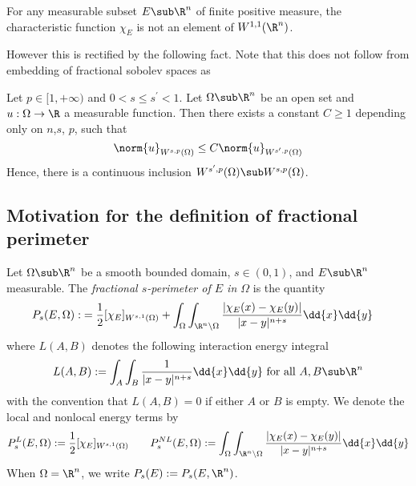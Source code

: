 \documentclass[../main.tex]{subfiles}
\begin{document}
\begin{fact}
    For any measurable subset $ E\sub \R^{n} $ of finite positive measure, the characteristic function $ \chi_{E} $ is not an element of $ W^{1,1}(\R^{n})$.
\end{fact}




However this is rectified by the following fact. Note that this does not follow from embedding of fractional sobolev spaces as $  $



\begin{proposition}
    Let $ p\in[1,+\infty) $ and $ 0 < s \leq s^{\prime} < 1 $. Let $ \Omega\sub \R^{n} $ be an open set and $ u:\Omega\to \R $ a measurable function. Then there exists a constant $ C \geq 1 $ depending only on $ n$,$s$, $p$, such that
    \[
        \norm{u}_{W^{s,p}(\Omega)} \leq C\norm{u}_{W^{s^{\prime},p}(\Omega)}
    \]
    Hence, there is a continuous inclusion $ W^{s^{\prime},p}(\Omega)\sub W^{s,p}(\Omega)$.
\end{proposition}



\subsection{Motivation for the definition of fractional perimeter}


\begin{definition}\label{fracperim}
    Let $ \Omega\sub \R^{n} $ be a smooth bounded domain, $ s\in (0,1) $, and $ E\sub \R^{n} $ measurable. The \textit{fractional $ s $-perimeter of $ E $ in $ \Omega $} is the quantity
    \begin{align*}
        P_{s}(E, \Omega) :&= \frac{1}{2}[\chi_{E}]_{W^{s,1}(\Omega)} + \int_{\Omega}\int_{\R^{n}\setminus \Omega} \frac{| \chi_{E}(x) - \chi_{E}(y)|}{|x-y|^{n+s}}\dd{x}\dd{y} 
    \end{align*}
    where $ L(A,B) $ denotes the following interaction energy integral
    \[
        L(A,B) := \int_{A}\int_{B}\frac{1}{|x-y|^{n+s}}\dd{x}\dd{y} \text{ for all } A,B\sub \R^{n}
    \]
    with the convention that $ L(A,B) = 0 $ if either $ A $ or $ B $ is empty. We denote the local and nonlocal energy terms by
    \[
        P_{s}^{L}(E,\Omega) := \frac{1}{2}[\chi_{E}]_{W^{s,1}(\Omega)} \quad \quad P_{s}^{NL}(E,\Omega) := \int_{\Omega}\int_{\R^{n}\setminus \Omega} \frac{| \chi_{E}(x) - \chi_{E}(y)|}{|x-y|^{n+s}}\dd{x}\dd{y} 
    \]
    When $ \Omega =\R^{n} $, we write $ P_{s}(E):= P_{s}(E,\R^{n}) $.
\end{definition}
\end{document}
